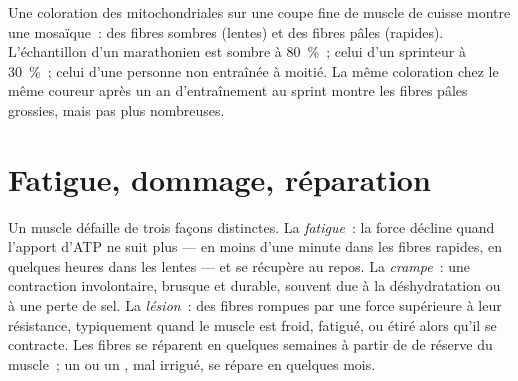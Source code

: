 \begin{example}\label{ex:g10:muscles-and-joints:biopsy}
Une coloration des  mitochondriales sur une coupe fine de muscle
de cuisse montre une mosaïque~: des fibres sombres (lentes) et des
fibres pâles (rapides). L'échantillon d'un marathonien est sombre à
80~\%~; celui d'un sprinteur à 30~\%~; celui d'une personne non
entraînée à moitié. La même coloration chez le même coureur après un an
d'entraînement au sprint montre les fibres pâles grossies, mais pas
plus nombreuses.
\end{example}

\section{Fatigue, dommage, réparation}

\begin{proposition}\label{prop:g10:muscles-and-joints:limits}
Un muscle défaille de trois façons distinctes. La \emph{fatigue}~: la
force décline quand l'apport d'ATP ne suit plus --- en moins d'une
minute dans les fibres rapides, en quelques heures dans les lentes ---
et se récupère au repos. La \emph{crampe}~: une contraction
involontaire, brusque et durable, souvent due à la déshydratation ou à
une perte de sel. La \emph{lésion}~: des fibres rompues par une force
supérieure à leur résistance, typiquement quand le muscle est froid,
fatigué, ou étiré alors qu'il se contracte. Les fibres se réparent en
quelques semaines à partir de  de réserve du muscle~; un 
ou un , mal irrigué, se répare en quelques mois.
\end{proposition}
\admitted

